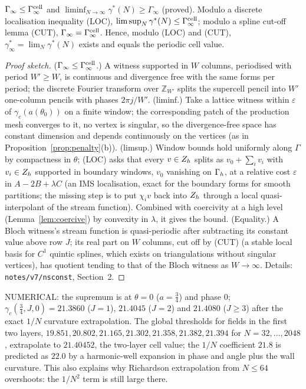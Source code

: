 \begin{proposition}\label{pb:gamlim}
$\Gamma_\infty\le\Gamma^{\rm cell}_\infty$ and $\liminf_{N\to\infty}\gamma^\ast(N)\ge\Gamma_\infty$ (proved). Modulo a discrete localisation inequality (LOC), $\limsup_N\gamma^\ast(N)\le\Gamma^{\rm cell}_\infty$; modulo a spline cut-off lemma (CUT), $\Gamma_\infty=\Gamma^{\rm cell}_\infty$. Hence, modulo (LOC) and (CUT), $\gamma^\ast_\infty=\lim_N\gamma^\ast(N)$ exists and equals the periodic cell value.
\end{proposition}

\begin{proof}[Proof sketch]
($\Gamma_\infty\le\Gamma^{\rm cell}_\infty$.) A witness supported in $W$ columns, periodised with period $W'\ge W$, is continuous and divergence free with the same forms per period; the discrete Fourier transform over $\mathbb Z_{W'}$ splits the supercell pencil into $W'$ one-column pencils with phases $2\pi j/W'$. (liminf.) Take a lattice witness within $\varepsilon$ of $\gamma_c(a(\theta_0))$ on a finite window; the corresponding patch of the production mesh converges to it, no vertex is singular, so the divergence-free space has constant dimension and depends continuously on the vertices (as in Proposition~\ref{prop:penalty}(b)). (limsup.) Window bounds hold uniformly along $\Gamma$ by compactness in $\theta$; (LOC) asks that every $v\in Z_h$ splits as $v_0+\sum_iv_i$ with $v_i\in Z_h$ supported in boundary windows, $v_0$ vanishing on $\Gamma_h$, at a relative cost $\varepsilon$ in $A-2B+\lambda C$ (an IMS localisation, exact for the boundary forms for smooth partitions; the missing step is to put $\chi_iv$ back into $Z_h$ through a local quasi-interpolant of the stream function). Combined with coercivity at a high level (Lemma~\ref{lem:coercive}) by convexity in $\lambda$, it gives the bound. (Equality.) A Bloch witness's stream function is quasi-periodic after subtracting its constant value above row $J$; its real part on $W$ columns, cut off by (CUT) (a stable local basis for $C^1$ quintic splines, which exists on triangulations without singular vertices), has quotient tending to that of the Bloch witness as $W\to\infty$. Details: \texttt{notes/v7/nsconst}, Section~2.
\end{proof}

NUMERICAL: the supremum is at $\theta=0$ ($a=\frac34$) and phase $0$; $\gamma_c(\frac34,J,0)=21.3860$ ($J=1$), $21.4045$ ($J=2$) and $21.4080$ ($J\ge3$) after the exact $1/N$ curvature extrapolation. The global thresholds for fields in the first two layers, $19.851,20.802,21.165,21.302,21.358,21.382,21.394$ for $N=32,\dots,2048$, extrapolate to $21.40452$, the two-layer cell value; the $1/N$ coefficient $21.8$ is predicted as $22.0$ by a harmonic-well expansion in phase and angle plus the wall curvature. This also explains why Richardson extrapolation from $N\le64$ overshoots: the $1/N^2$ term is still large there.
